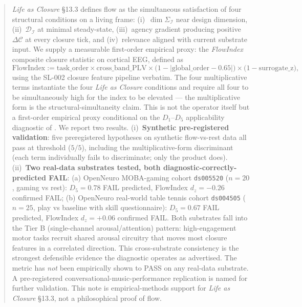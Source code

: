 \documentclass[11pt,a4paper]{article}
\begin{document}
\begin{abstract}
\bigskip
\emph{Life as Closure} \citep{SmartLifeAsClosure} \S 13.3 defines flow as the simultaneous satisfaction of four structural conditions on a living frame: (i)~$\dim \Sigma_\mathcal{I}$ near design dimension, (ii)~$\mathcal{D}_\mathcal{I}$ at minimal steady-state, (iii)~agency gradient producing positive $\Delta\mathcal{C}$ at every closure tick, and (iv)~relevance aligned with current substrate input. We supply a measurable first-order empirical proxy: the \emph{FlowIndex} composite closure statistic on cortical EEG, defined as
\[
  \mathrm{FlowIndex} := \mathrm{task\_order} \times \mathrm{cross\_band\_PLV} \times \big(1 - |\mathrm{global\_order} - 0.65|\big) \times \big(1 - \mathrm{surrogate\_z}\big),
\]
using the SL-002 \citep{SolutionLab002} closure feature pipeline verbatim. The four multiplicative terms instantiate the four \emph{Life as Closure} conditions and require all four to be simultaneously high for the index to be elevated --- the multiplicative form is the structural-simultaneity claim. This is not the operator itself but a first-order empirical proxy conditional on the $D_1$--$D_5$ applicability diagnostic of \citep{SmartClosureDistance}. We report two results. (i)~\textbf{Synthetic pre-registered validation}: five preregistered hypotheses on synthetic flow-vs-rest data all pass at threshold ($5/5$), including the multiplicative-form discriminant (each term individually fails to discriminate; only the product does). (ii)~\textbf{Two real-data substrates tested, both diagnostic-correctly-predicted FAIL}: (a) OpenNeuro MOBA-gaming cohort \texttt{ds005520} \citep{LiMOBA2024} ($n = 20$, gaming vs rest): $D_5 = 0.78$ FAIL predicted, FlowIndex $d_z = -0.26$ confirmed FAIL; (b) OpenNeuro real-world table tennis cohort \texttt{ds004505} \citep{StudnickiTableTennis2022} ($n = 25$, play vs baseline with skill questionnaire): $D_5 = 0.67$ FAIL predicted, FlowIndex $d_z = +0.06$ confirmed FAIL. Both substrates fall into the Tier B (single-channel arousal/attention) pattern: high-engagement motor tasks recruit shared arousal circuitry that moves most closure features in a correlated direction. This cross-substrate consistency is the strongest defensible evidence the diagnostic operates as advertised. The metric has \emph{not} been empirically shown to PASS on any real-data substrate. A pre-registered conversational-music-performance replication is named for further validation. This note is empirical-methods support for \emph{Life as Closure} \S 13.3, not a philosophical proof of flow.
\end{abstract}
\end{document}
